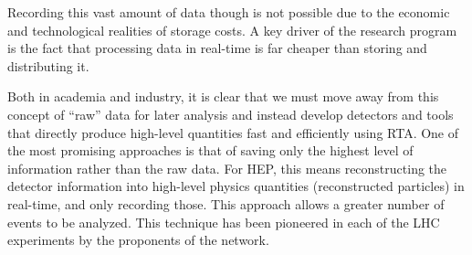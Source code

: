 Recording this vast amount of data though is not possible due to the economic and technological realities of storage costs. A key driver of the \acronym research program is the fact that processing data in real-time is far cheaper than storing and distributing it. 

Both in academia and industry, it is clear that we must move away from this concept of ``raw'' data for later analysis and instead develop detectors and tools that directly produce high-level quantities fast and efficiently using RTA.
One of the most promising approaches is that of saving only the highest level of information rather than the raw data. 
For HEP, this means reconstructing the detector information into high-level physics quantities (reconstructed particles) in real-time, and only recording those.
This approach allows a greater number of events to be analyzed.
This technique has been pioneered in each of the LHC experiments by the proponents of the \acronym network. 

